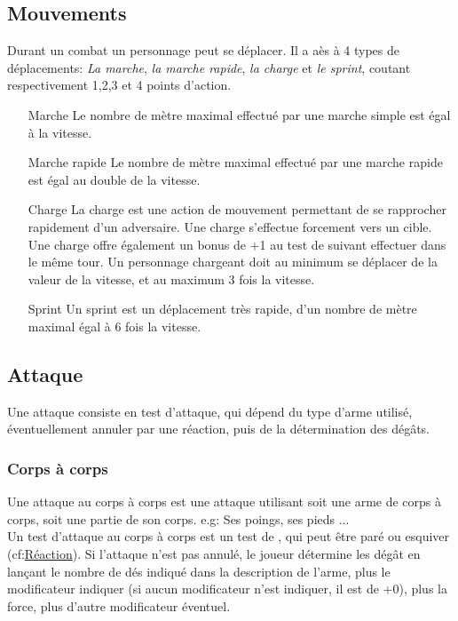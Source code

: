 \subsection{Mouvements}
Durant un combat un personnage peut se déplacer. Il a aès à 4 types de déplacements: \textit{La marche}, \textit{la marche rapide}, \textit{la charge} et \textit{le sprint}, coutant respectivement 1,2,3 et 4 points d'action.
\begin{itemize}
\item[Marche] Le nombre de mètre maximal effectué par une marche simple est égal à la vitesse.
\item[Marche rapide] Le nombre de mètre maximal effectué par une marche rapide est égal au double de la vitesse.
\item[Charge] La charge est une action de mouvement permettant de se rapprocher rapidement d'un adversaire. Une charge s'effectue forcement vers un cible. Une charge offre également un bonus de +1 au test de  suivant effectuer dans le même tour. Un personnage chargeant doit au minimum se déplacer de la valeur de la vitesse, et au maximum 3 fois la vitesse.
\item[Sprint] Un sprint est un déplacement très rapide, d'un nombre de mètre maximal égal à 6 fois la vitesse.
\end{itemize}

\subsection{Attaque}
Une attaque consiste en test d'attaque, qui dépend du type d'arme utilisé, éventuellement annuler par une réaction, puis de la détermination des dégâts.
\subsubsection*{Corps à corps}
Une attaque au corps à corps est une attaque utilisant soit une arme de corps à corps, soit une partie de son corps. e.g: Ses poings, ses pieds ... \\
Un test d'attaque au corps à corps est un test de , qui peut être paré ou esquiver (cf:\hyperlink{reac}{Réaction}). Si l'attaque n'est pas annulé, le joueur détermine les dégât en lançant le nombre de dés indiqué dans la description de l'arme, plus le modificateur indiquer (si aucun modificateur n'est indiquer, il est de +0), plus la force, plus d'autre modificateur éventuel. 

